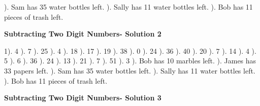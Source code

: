 \documentclass{article}%
\begin{document}
). Sam has 35 water bottles left.%
). Sally has 11 water bottles left.%
). Bob has 11 pieces of trash left.%
\newline%
\newpage%
\large%
\begin{center}%
\textbf{Subtracting Two Digit Numbers- Solution 2}%
\newline%
\end{center} \normalsize%
1). 4%
). 7%
). 25%
). 4%
). 18%
). 17%
). 19%
). 38%
). 0%
). 24%
). 36%
). 40%
). 20%
). 7%
). 14%
). 4%
). 5%
). 6%
). 36%
). 24%
). 13%
). 21%
). 7%
). 51%
). 3%
). Bob has 10 marbles left.%
). James has 33 papers left.%
). Sam has 35 water bottles left.%
). Sally has 11 water bottles left.%
). Bob has 11 pieces of trash left.%
\newline%
\newpage%
\large%
\begin{center}%
\textbf{Subtracting Two Digit Numbers- Solution 3}%
\newline%
\end{center} \normalsize%
\end{document}
